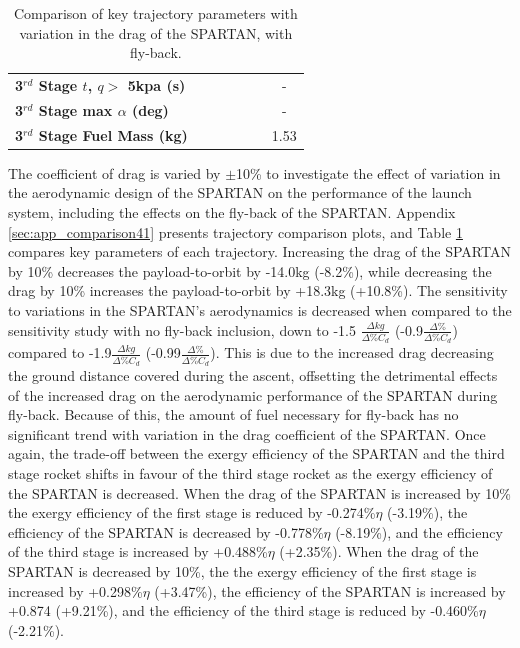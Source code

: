 \begin{table}[ht]
\begin{tabular}{l c c c c c c}
		\textbf{3$^{rd}$ Stage $t$, $q >$ 5kpa (s)}
		& \thirdqOverFiveCdNinety
		& \thirdqOverFiveCdNinetyFive
		& \thirdqOverFiveCdStandard
		& \thirdqOverFiveCdOneHundredFive
		& \thirdqOverFiveCdOneHundredTen
		& -
		\\
		\textbf{3$^{rd}$ Stage max $\alpha$ (deg)}
		& \thirdmaxAoACdNinety
		& \thirdmaxAoACdNinetyFive
		& \thirdmaxAoACdStandard
		& \thirdmaxAoACdOneHundredFive
		& \thirdmaxAoACdOneHundredTen
		& -
		\\
		\textbf{3$^{rd}$ Stage Fuel Mass (kg)}
		& \thirdmFuelCdNinety
		& \thirdmFuelCdNinetyFive
		& \thirdmFuelCdStandard
		& \thirdmFuelCdOneHundredFive
		& \thirdmFuelCdOneHundredTen
		&1.53
		\\
		\hline 
	\end{tabular} 
	\caption{Comparison of key trajectory parameters with variation in the drag of the SPARTAN, with fly-back.}
	\label{tab:comparison41}
\end{table}


The coefficient of drag is varied by $\pm$10\% to investigate the effect of variation in the aerodynamic design of the SPARTAN on the performance of the launch system, including the effects on the fly-back of the SPARTAN. Appendix \ref{sec:app_comparison41} presents trajectory comparison plots, and Table \ref{tab:comparison41} compares key parameters of each trajectory. 
Increasing the drag of the SPARTAN by 10\% decreases the payload-to-orbit by -14.0kg (-8.2\%), while decreasing the drag by 10\% increases the payload-to-orbit by +18.3kg (+10.8\%). 
The sensitivity to variations in the SPARTAN's aerodynamics is decreased when compared to the sensitivity study with no fly-back inclusion, down to -1.5 $\frac{\Delta kg}{\Delta\% C_{d}}$ (-0.9$\frac{\Delta \%}{\Delta\% C_{d}}$) compared to -1.9$\frac{\Delta kg}{\Delta\% C_{d}}$  (-0.99$\frac{\Delta \%}{\Delta\% C_{d}}$). 
This is due to the increased drag decreasing the ground distance covered during the ascent, offsetting the detrimental effects of the increased drag on the aerodynamic performance of the SPARTAN during fly-back. Because of this, the amount of fuel necessary for fly-back has no significant trend with variation in the drag coefficient of the SPARTAN. 
Once again, the trade-off between the exergy efficiency of the SPARTAN and the third stage rocket shifts in favour of the third stage rocket as the exergy efficiency of the SPARTAN is decreased. When the drag of the SPARTAN is increased by 10\% the exergy efficiency of the first stage is reduced by -0.274\%$\eta$ (-3.19\%), the efficiency of the SPARTAN is decreased by -0.778\%$\eta$ (-8.19\%), and the efficiency of the third stage is increased by +0.488\%$\eta$ (+2.35\%). When the drag of the SPARTAN is decreased by 10\%, the the exergy efficiency of the first stage is increased by +0.298\%$\eta$ (+3.47\%), the efficiency of the SPARTAN is increased by +0.874 (+9.21\%), and the efficiency of the third stage is reduced by -0.460\%$\eta$ (-2.21\%). 



